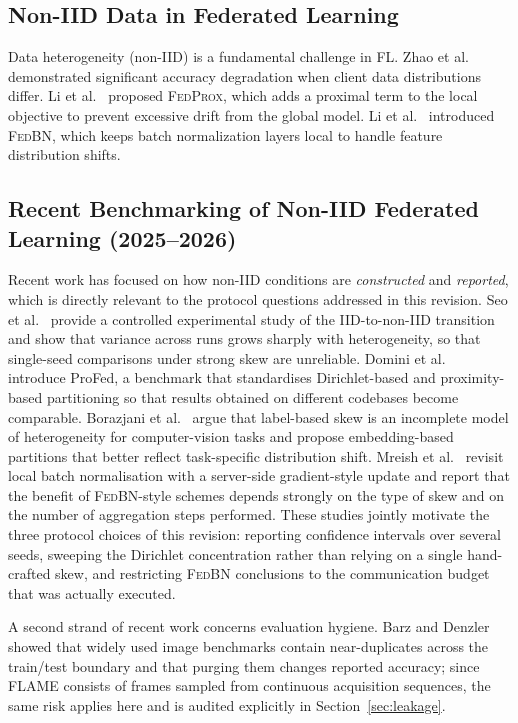 \documentclass[journal]{IEEEtran}
\newcommand{\fedprox}{\textsc{FedProx}}
\newcommand{\fedbn}{\textsc{FedBN}}
\begin{document}
\subsection{Non-IID Data in Federated Learning}

Data heterogeneity (non-IID) is a fundamental challenge in FL. Zhao et al.~\cite{zhao2018noniid} demonstrated significant accuracy degradation when client data distributions differ. Li et al.~\cite{li2020fedprox} proposed \fedprox{}, which adds a proximal term to the local objective to prevent excessive drift from the global model. Li et al.~\cite{li2021fedbn} introduced \fedbn{}, which keeps batch normalization layers local to handle feature distribution shifts.

\subsection{Recent Benchmarking of Non-IID Federated Learning (2025--2026)}

Recent work has focused on how non-IID conditions are \emph{constructed} and \emph{reported}, which is directly relevant to the protocol questions addressed in this revision. Seo et al.~\cite{seo2025iidnoniid} provide a controlled experimental study of the IID-to-non-IID transition and show that variance across runs grows sharply with heterogeneity, so that single-seed comparisons under strong skew are unreliable. Domini et al.~\cite{domini2025profed} introduce ProFed, a benchmark that standardises Dirichlet-based and proximity-based partitioning so that results obtained on different codebases become comparable. Borazjani et al.~\cite{borazjani2026embeddings} argue that label-based skew is an incomplete model of heterogeneity for computer-vision tasks and propose embedding-based partitions that better reflect task-specific distribution shift. Mreish et al.~\cite{mreish2025mfedbn} revisit local batch normalisation with a server-side gradient-style update and report that the benefit of \fedbn{}-style schemes depends strongly on the type of skew and on the number of aggregation steps performed. These studies jointly motivate the three protocol choices of this revision: reporting confidence intervals over several seeds, sweeping the Dirichlet concentration rather than relying on a single hand-crafted skew, and restricting \fedbn{} conclusions to the communication budget that was actually executed.

A second strand of recent work concerns evaluation hygiene. Barz and Denzler~\cite{barz2020duplicates} showed that widely used image benchmarks contain near-duplicates across the train/test boundary and that purging them changes reported accuracy; since FLAME consists of frames sampled from continuous acquisition sequences, the same risk applies here and is audited explicitly in Section~\ref{sec:leakage}.
\end{document}
